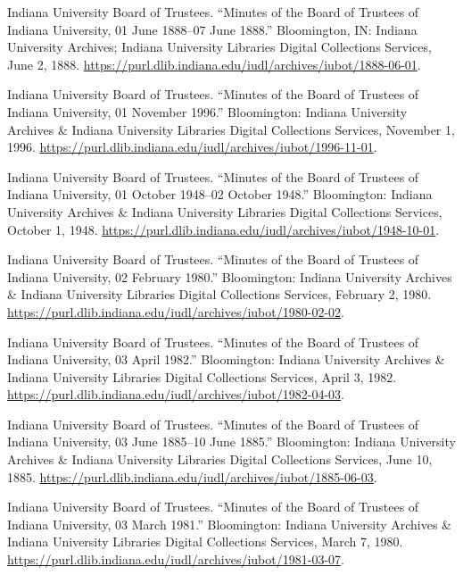 \documentclass[
  american,
  letterpaper,
]{scrreprt}
\newlength{\cslhangindent}
\newenvironment{CSLReferences}[2] %
 {\begin{list}{}{%
  \setlength{\itemindent}{0pt}
  \setlength{\leftmargin}{0pt}
  \setlength{\parsep}{0pt}
  \ifodd #1
   \setlength{\leftmargin}{\cslhangindent}
   \setlength{\itemindent}{-1\cslhangindent}
  \fi
  \setlength{\itemsep}{#2\baselineskip}}}
 {\end{list}}
\begin{document}
\begin{CSLReferences}{1}{0}
Indiana University Board of Trustees. {``Minutes of the Board of
Trustees of Indiana University, 01 June 1888--07 June 1888.''}
Bloomington, IN: Indiana University Archives; Indiana University
Libraries Digital Collections Services, June 2, 1888.
\url{https://purl.dlib.indiana.edu/iudl/archives/iubot/1888-06-01}.

Indiana University Board of Trustees. {``Minutes of the Board of
Trustees of Indiana University, 01 November 1996.''} Bloomington:
Indiana University Archives \& Indiana University Libraries Digital
Collections Services, November 1, 1996.
\url{https://purl.dlib.indiana.edu/iudl/archives/iubot/1996-11-01}.

Indiana University Board of Trustees. {``Minutes of the Board of
Trustees of Indiana University, 01 October 1948--02 October 1948.''}
Bloomington: Indiana University Archives \& Indiana University Libraries
Digital Collections Services, October 1, 1948.
\url{https://purl.dlib.indiana.edu/iudl/archives/iubot/1948-10-01}.

Indiana University Board of Trustees. {``Minutes of the Board of
Trustees of Indiana University, 02 February 1980.''} Bloomington:
Indiana University Archives \& Indiana University Libraries Digital
Collections Services, February 2, 1980.
\url{https://purl.dlib.indiana.edu/iudl/archives/iubot/1980-02-02}.

Indiana University Board of Trustees. {``Minutes of the Board of
Trustees of Indiana University, 03 April 1982.''} Bloomington: Indiana
University Archives \& Indiana University Libraries Digital Collections
Services, April 3, 1982.
\url{https://purl.dlib.indiana.edu/iudl/archives/iubot/1982-04-03}.

Indiana University Board of Trustees. {``Minutes of the Board of
Trustees of Indiana University, 03 June 1885--10 June 1885.''}
Bloomington: Indiana University Archives \& Indiana University Libraries
Digital Collections Services, June 10, 1885.
\url{https://purl.dlib.indiana.edu/iudl/archives/iubot/1885-06-03}.

Indiana University Board of Trustees. {``Minutes of the Board of
Trustees of Indiana University, 03 March 1981.''} Bloomington: Indiana
University Archives \& Indiana University Libraries Digital Collections
Services, March 7, 1980.
\url{https://purl.dlib.indiana.edu/iudl/archives/iubot/1981-03-07}.


\end{CSLReferences}
\end{document}
